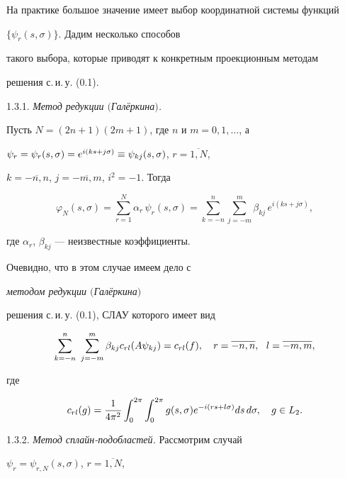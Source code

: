 




На практике большое значение имеет выбор координатной системы функций


$\{ \psi_r(s,\sigma )\}$. Дадим несколько способов


такого выбора, которые приводят к конкретным проекционным методам 


решения с.\,и.\,у. (0.1). 


\medskip





1.3.1. {\it Метод редукции $($Гал\"еркина$)$.} 


Пусть $N=(2n+1)(2m+1)$, где $n$ и $m=0,1,\dotsc$, а


$\psi_r=\psi_r(s,\sigma )=


e^{i(ks+j\sigma )}\equiv \psi_{kj}(s,\si)$, $r=\overline{1,N}$,


$k=\overline{-n,n}$, $j=\overline{-m,m}$, $i^2=-1$. Тогда


$$


\varphi_N (s,\sigma )=\sum_{r=1}^N\alpha _r\, \psi_r(s,\sigma )=


\sum_{k=-n}^n\sum_{j=-m}^m\beta_{kj}\, e^{i(ks+j\sigma )} ,


$$


где $\alpha_r$, $\beta_{kj}$ --- неизвестные коэффициенты.





Очевидно, что в этом случае имеем дело с 


{\it методом редукции $($Гал\"еркина$)$}


решения с.\,и.\,у. (0.1), СЛАУ которого имеет вид 


$$


\sum_{k=-n}^n\ \sum_{j=-m}^m \beta_{kj} c_{rl}(A\psi_{kj}) =


c_{rl}(f),\quad r=\ol{-n,n},\ \ l=\ol{-m,m},


$$


где


$$


c_{rl}(g) = \frac{1}{4\pi^2}\int_{0}^{2\pi}\int_{0}^{2\pi}g(s,\si)


e^{-i(rs+l\si)}ds\, d\si,\quad g\in L_2.


$$





1.3.2. {\it Метод сплайн-подобластей. } Рассмотрим случай 


$\psi_r=\psi_{r,N}(s,\sigma )$, $r=\overline{1,N}$,


